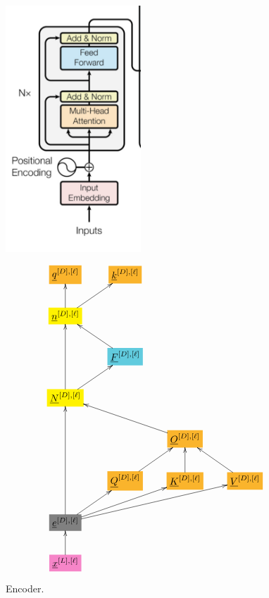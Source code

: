 \documentclass[12pt]{article}
\begin{document}
\begin{figure}[h!]\centering
\begin{minipage}{.5\linewidth}
\includegraphics[width=2in]{encoder.jpg}
\end{minipage}%
\begin{minipage}{.5\linewidth}
$$\xymatrix{
*+[F*:Dandelion]{\underline{q}^{[D], [\ell]}}&*+[F*:Dandelion]{\underline{k}^{[D], [\ell]}}&&
\\
*+[F*:yellow]{\underline{n}^{[D], [\ell]}}\ar[ur]\ar[u]&&&
\\
&*+[F*:SkyBlue]{\underline{F}^{[D], [\ell]}}\ar[ul]&&
\\
*+[F*:yellow]{\underline{N}^{[D], [\ell]}}\ar[ur]\ar[uu]&&&
\\
&&*+[F*:Dandelion]{\underline{O}^{[D], [\ell]}}\ar[ull]&
\\
&*+[F*:Dandelion]{\underline{Q}^{[D], [\ell]}}\ar[ur]&*+[F*:Dandelion]{\underline{K}^{[D], [\ell]}}\ar[u]&*+[F*:Dandelion]{\underline{V}^{[D],[\ell]}}\ar[ul]
\\
*+[F*:gray]{\underline{e}^{[D], [\ell]}}\ar[urr]\ar[uuu]\ar[ur]\ar[urrr]&&&
\\
*+[F*:Lavender]{\underline{x}^{[L],[\ell]}}\ar[u]&&&
}$$
\end{minipage}
\caption{Encoder.}
\label{fig-texnn-for-encoder}
\end{figure}
\end{document}
